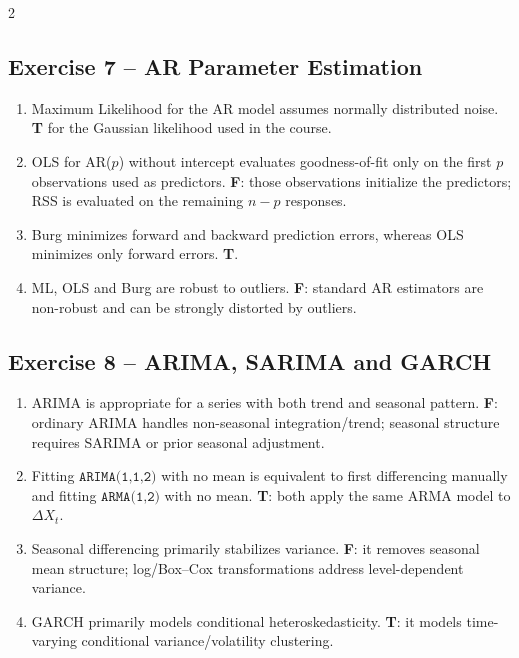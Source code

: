 \documentclass[9pt,a4paper]{extarticle}
\begin{document}
\begin{multicols}{2}
\subsection*{Exercise 7 -- AR Parameter Estimation}
\begin{enumerate}[label=\alph*),leftmargin=4mm]
\item Maximum Likelihood for the AR model assumes normally distributed noise. \textbf{T} for the Gaussian likelihood used in the course.
\item OLS for AR(\(p\)) without intercept evaluates goodness-of-fit only on the first \(p\) observations used as predictors. \textbf{F}: those observations initialize the predictors; RSS is evaluated on the remaining \(n-p\) responses.
\item Burg minimizes forward and backward prediction errors, whereas OLS minimizes only forward errors. \textbf{T}.
\item ML, OLS and Burg are robust to outliers. \textbf{F}: standard AR estimators are non-robust and can be strongly distorted by outliers.
\end{enumerate}

\subsection*{Exercise 8 -- ARIMA, SARIMA and GARCH}
\begin{enumerate}[label=\alph*),leftmargin=4mm]
\item ARIMA is appropriate for a series with both trend and seasonal pattern. \textbf{F}: ordinary ARIMA handles non-seasonal integration/trend; seasonal structure requires SARIMA or prior seasonal adjustment.
\item Fitting \(\texttt{ARIMA(1,1,2)}\) with no mean is equivalent to first differencing manually and fitting \(\texttt{ARMA(1,2)}\) with no mean. \textbf{T}: both apply the same ARMA model to \(\Delta X_t\).
\item Seasonal differencing primarily stabilizes variance. \textbf{F}: it removes seasonal mean structure; log/Box--Cox transformations address level-dependent variance.
\item GARCH primarily models conditional heteroskedasticity. \textbf{T}: it models time-varying conditional variance/volatility clustering.
\end{enumerate}


\end{multicols}
\end{document}
